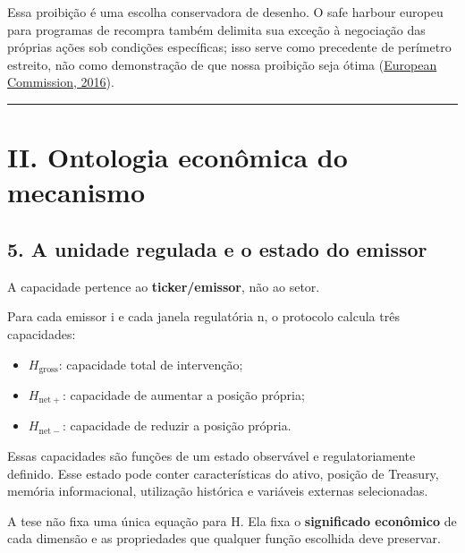 \documentclass[
  a4paper,
]{article}
\providecommand{\tightlist}{%
  \setlength{\itemsep}{0pt}\setlength{\parskip}{0pt}}
\begin{document}
Essa proibição é uma escolha conservadora de desenho. O safe harbour
europeu para programas de recompra também delimita sua exceção à
negociação das próprias ações sob condições específicas; isso serve como
precedente de perímetro estreito, não como demonstração de que nossa
proibição seja ótima (\protect\hyperlink{ref-3}{European Commission,
2016}).

\begin{center}\rule{0.5\linewidth}{0.5pt}\end{center}

\hypertarget{ii-ontologia-economica-do-mecanismo}{}

\hypertarget{ii-ontologia-econuxf4mica-do-mecanismo-1}{%
\section{II. Ontologia econômica do
mecanismo}\label{ii-ontologia-econuxf4mica-do-mecanismo-1}}

\hypertarget{5-a-unidade-regulada-e-o-estado-do-emissor}{}

\hypertarget{5-a-unidade-regulada-e-o-estado-do-emissor}{%
\subsection{5. A unidade regulada e o estado do
emissor}\label{5-a-unidade-regulada-e-o-estado-do-emissor}}

A capacidade pertence ao \textbf{ticker/emissor}, não ao setor.

Para cada emissor i e cada janela regulatória n, o protocolo calcula
três capacidades:

\begin{itemize}
\tightlist
\item
  \textbf{\(H_{\mathrm{gross}}\)}: capacidade total de intervenção;
\item
  \textbf{\(H_{\mathrm{net}+}\)}: capacidade de aumentar a posição
  própria;
\item
  \textbf{\(H_{\mathrm{net}-}\)}: capacidade de reduzir a posição
  própria.
\end{itemize}

Essas capacidades são funções de um estado observável e regulatoriamente
definido. Esse estado pode conter características do ativo, posição de
Treasury, memória informacional, utilização histórica e variáveis
externas selecionadas.

A tese não fixa uma única equação para H. Ela fixa o \textbf{significado
econômico} de cada dimensão e as propriedades que qualquer função
escolhida deve preservar.
\end{document}

